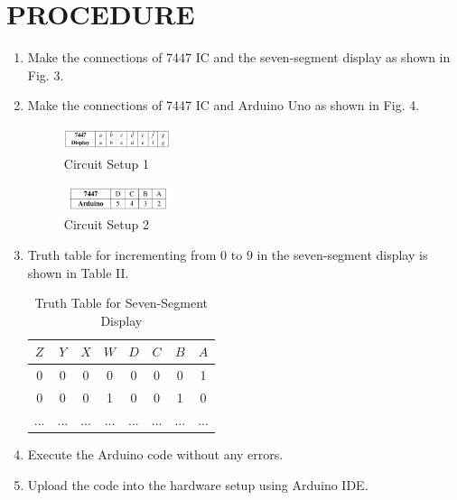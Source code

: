 \documentclass[conference]{IEEEtran}
\begin{document}
\section{PROCEDURE}
\begin{enumerate}
\item Make the connections of 7447 IC and the seven-segment display as shown in Fig. 3.
\item Make the connections of 7447 IC and Arduino Uno as shown in Fig. 4.

\begin{figure}[htbp] 
\centering 
\includegraphics[width=0.3\textwidth]{7447044.jpg}
\caption{\label{fig-3:Gates} Circuit Setup 1}    
\end{figure}

\begin{figure}[htbp]                     
\centering                           
\includegraphics[width=0.3\textwidth]{744705.jpg}                                 
\caption{\label{fig-4:Gates} Circuit Setup 2}         
\end{figure}

\item Truth table for incrementing from $0$ to $9$ in the seven-segment display is shown in Table II.

\begin{table}[htbp]
\centering
\begin{tabular}{| c | c | c | c | c | c | c | c |} 
\hline
$Z$ & $Y$ & $X$ & $W$ & $D$ & $C$ & $B$ & $A$ \\
\hline
0   & 0   & 0   & 0   & 0  & 0 & 0  & 1 \\
0   & 0   & 0   & 1   & 0  & 0 & 1  & 0 \\
... & ... & ... & ... & ... & ... & ... & ... \\ 
\hline
\end{tabular}
\vspace{0.15cm}
\caption{\label{tab:widgets} Truth Table for Seven-Segment Display}
\end{table}

\item Execute the Arduino code without any errors.
\item Upload the code into the hardware setup using Arduino IDE.
\end{enumerate}
\end{document}
